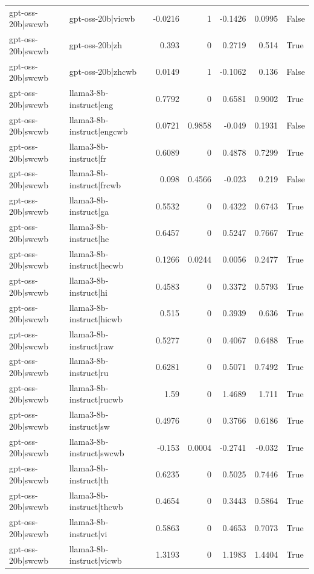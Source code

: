 \begin{table}
\begin{tabular}{l l r r r r l}
gpt-oss-20b|swcwb & gpt-oss-20b|vicwb & -0.0216 & 1 & -0.1426 & 0.0995 & False \\
gpt-oss-20b|swcwb & gpt-oss-20b|zh & 0.393 & 0 & 0.2719 & 0.514 & True \\
gpt-oss-20b|swcwb & gpt-oss-20b|zhcwb & 0.0149 & 1 & -0.1062 & 0.136 & False \\
gpt-oss-20b|swcwb & llama3-8b-instruct|eng & 0.7792 & 0 & 0.6581 & 0.9002 & True \\
gpt-oss-20b|swcwb & llama3-8b-instruct|engcwb & 0.0721 & 0.9858 & -0.049 & 0.1931 & False \\
gpt-oss-20b|swcwb & llama3-8b-instruct|fr & 0.6089 & 0 & 0.4878 & 0.7299 & True \\
gpt-oss-20b|swcwb & llama3-8b-instruct|frcwb & 0.098 & 0.4566 & -0.023 & 0.219 & False \\
gpt-oss-20b|swcwb & llama3-8b-instruct|ga & 0.5532 & 0 & 0.4322 & 0.6743 & True \\
gpt-oss-20b|swcwb & llama3-8b-instruct|he & 0.6457 & 0 & 0.5247 & 0.7667 & True \\
gpt-oss-20b|swcwb & llama3-8b-instruct|hecwb & 0.1266 & 0.0244 & 0.0056 & 0.2477 & True \\
gpt-oss-20b|swcwb & llama3-8b-instruct|hi & 0.4583 & 0 & 0.3372 & 0.5793 & True \\
gpt-oss-20b|swcwb & llama3-8b-instruct|hicwb & 0.515 & 0 & 0.3939 & 0.636 & True \\
gpt-oss-20b|swcwb & llama3-8b-instruct|raw & 0.5277 & 0 & 0.4067 & 0.6488 & True \\
gpt-oss-20b|swcwb & llama3-8b-instruct|ru & 0.6281 & 0 & 0.5071 & 0.7492 & True \\
gpt-oss-20b|swcwb & llama3-8b-instruct|rucwb & 1.59 & 0 & 1.4689 & 1.711 & True \\
gpt-oss-20b|swcwb & llama3-8b-instruct|sw & 0.4976 & 0 & 0.3766 & 0.6186 & True \\
gpt-oss-20b|swcwb & llama3-8b-instruct|swcwb & -0.153 & 0.0004 & -0.2741 & -0.032 & True \\
gpt-oss-20b|swcwb & llama3-8b-instruct|th & 0.6235 & 0 & 0.5025 & 0.7446 & True \\
gpt-oss-20b|swcwb & llama3-8b-instruct|thcwb & 0.4654 & 0 & 0.3443 & 0.5864 & True \\
gpt-oss-20b|swcwb & llama3-8b-instruct|vi & 0.5863 & 0 & 0.4653 & 0.7073 & True \\
gpt-oss-20b|swcwb & llama3-8b-instruct|vicwb & 1.3193 & 0 & 1.1983 & 1.4404 & True \\

\end{tabular}
\end{table}
